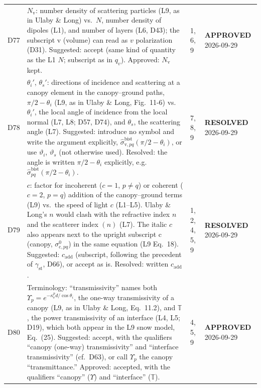 \documentclass[11pt, oneside]{article}
\newcommand{\approved}{\textbf{APPROVED}}
\newcommand{\resolved}{\textbf{RESOLVED}}
\begin{document}
\begin{longtable}{l >{\raggedright\arraybackslash}p{} l l}
D77 & $N_\mathrm{v}$: number density of scattering particles (L9, as in Ulaby \& Long) vs.\ $N$, number density of dipoles (L1), and number of layers (L6, D43); the subscript v (volume) can read as $v$ polarization (D31). Suggested: accept (same kind of quantity as the L1 $N$; subscript as in $q_v$). Approved: $N_\mathrm{v}$ kept. & 1, 6, 9 & \approved{} 2026-09-29 \\
D78 & $\theta_i'$, $\theta_s'$: directions of incidence and scattering at a canopy element in the canopy--ground paths, $\pi/2-\theta_i$ (L9, as in Ulaby \& Long, Fig.~11-6) vs.\ $\theta_i'$, the local angle of incidence from the local normal (L7, L8; D57, D74), and $\theta_s$, the scattering angle (L7). Suggested: introduce no symbol and write the argument explicitly, $\hat{\sigma}^\mathrm{bist}_{\mathrm{v},pq}(\pi/2-\theta_i)$, or use $\vartheta_i$, $\vartheta_s$ (not otherwise used). Resolved: the angle is written $\pi/2-\theta_i$ explicitly, e.g.\ $\hat{\sigma}^\mathrm{bist}_{pq}(\pi/2-\theta_i)$. & 7, 8, 9 & \resolved{} 2026-09-29 \\
D79 & $c$: factor for incoherent ($c=1$, $p\ne q$) or coherent ($c=2$, $p=q$) addition of the canopy--ground terms (L9) vs.\ the speed of light $c$ (L1--L5). Ulaby \& Long's $n$ would clash with the refractive index $n$ and the scatterer index $(n)$ (L7). The italic $c$ also appears next to the upright subscript c (canopy, $\sigma^0_{\mathrm{c},pq}$) in the same equation (L9 Eq.~18). Suggested: $c_\mathrm{add}$ (subscript, following the precedent of $\gamma_\mathrm{st}$, D66), or accept as is. Resolved: written $c_\mathrm{add}$. & 1, 2, 4, 5, 9 & \resolved{} 2026-09-29 \\
D80 & Terminology: ``transmissivity'' names both $\Upsilon_p = e^{-\kappa_\mathrm{e}^pd/\cos\theta_i}$, the one-way transmissivity of a canopy (L9, as in Ulaby \& Long, Eq.~11.2), and $\mathbb{T}$, the power transmissivity of an interface (L4, L5; D19), which both appear in the L9 snow model, Eq.~(25). Suggested: accept, with the qualifiers ``canopy (one-way) transmissivity'' and ``interface transmissivity'' (cf.\ D63), or call $\Upsilon_p$ the canopy ``transmittance.'' Approved: accepted, with the qualifiers ``canopy'' ($\Upsilon$) and ``interface'' ($\mathbb{T}$). & 4, 5, 9 & \approved{} 2026-09-29 \\

\end{longtable}
\end{document}
